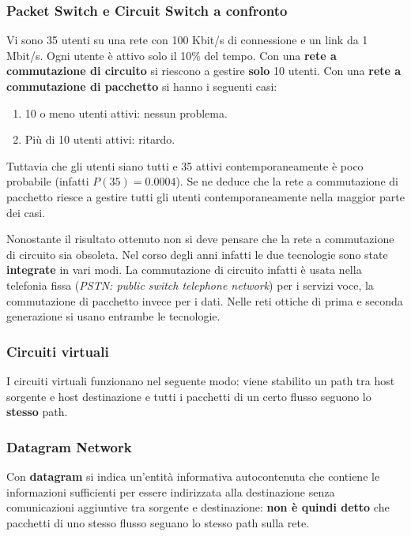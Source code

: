 \documentclass[11pt,a4paper]{article}
\theoremstyle{definition}
\begin{document}
\subsubsection{Packet Switch e Circuit Switch a confronto}
Vi sono 35 utenti su una rete con 100 Kbit/s di connessione e un link da 1 Mbit/s.
Ogni utente è attivo solo il 10\% del tempo.\newline
Con una \textbf{rete a commutazione di circuito} si riescono a gestire \textbf{solo} 10 utenti.\newline
Con una \textbf{rete a commutazione di pacchetto} si hanno i seguenti casi:
\begin{enumerate}
	\item 10 o meno utenti attivi: nessun problema.
	\item Più di 10 utenti attivi: ritardo.
\end{enumerate}
Tuttavia che gli utenti siano tutti e 35 attivi contemporaneamente è poco probabile (infatti $P(35) = 0.0004$).
Se ne deduce che la rete a commutazione di pacchetto riesce a gestire tutti gli utenti contemporaneamente nella maggior parte dei casi.

Nonostante il risultato ottenuto non si deve pensare che la rete a  commutazione di circuito sia obsoleta. Nel corso degli anni infatti le due tecnologie sono state \textbf{integrate} in vari modi.\newline
La commutazione di circuito infatti è usata nella telefonia fissa (\textit{PSTN: public switch telephone network}) per i servizi voce, la commutazione di pacchetto invece per i dati.\newline
Nelle reti ottiche di prima e seconda generazione si usano entrambe le tecnologie.

\subsubsection{Circuiti virtuali}
I circuiti virtuali funzionano nel seguente modo: viene stabilito un path tra host sorgente e host destinazione e tutti i pacchetti di un certo flusso seguono lo \textbf{stesso} path.
\subsubsection{Datagram Network}
Con \textbf{datagram} si indica un'entità informativa autocontenuta che contiene le informazioni sufficienti per essere indirizzata alla destinazione senza comunicazioni aggiuntive tra sorgente e destinazione: \textbf{non è quindi detto} che pacchetti di uno stesso flusso seguano lo stesso path sulla rete.
\newpage
\end{document}
